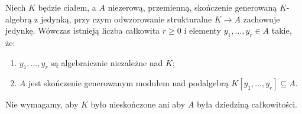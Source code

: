 \begin{twierdzenie}
\label{aa:tw:noether-normalization}
Niech $K$ będzie ciałem, a $A$ niezerową, przemienną,
skończenie generowaną $K$-algebrą z jedynką,
przy czym odwzorowanie strukturalne $K\to A$ zachowuje jedynkę.
Wówczas istnieją liczba całkowita $r\ge0$ i elementy
$y_1,\ldots,y_r\in A$ takie, że:
\begin{enumerate}[label=(\roman*)]
\item $y_1,\ldots,y_r$ są algebraicznie niezależne nad $K$;
\item $A$ jest skończenie generowanym modułem nad podalgebrą
      $K[y_1,\ldots,y_r]\subseteq A$.
\end{enumerate}
Nie wymagamy, aby $K$ było nieskończone ani aby $A$
była dziedziną całkowitości.
\end{twierdzenie}
